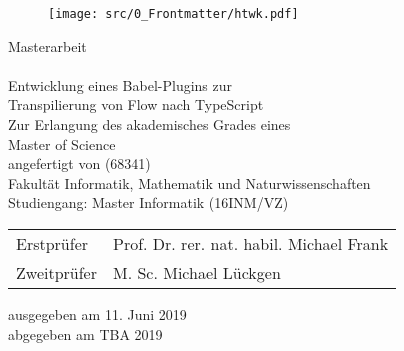 \makeatletter
\begin{titlepage}
  \vspace{1cm}

  \begin{figure}[h!]
    \centering
    \texttt{[image: src/0\_Frontmatter/htwk.pdf]}
  \end{figure}

  \begin{center}
    \vspace{1cm}

    \begin{onehalfspacing}
      {\Large Masterarbeit} \\[8ex]
      {\huge\textbf{\@title}} \\[5ex]
      {\Large\libertineSB Entwicklung eines Babel-Plugins zur\\Transpilierung von Flow nach TypeScript} \\[8ex]
      \large
      Zur Erlangung des akademisches Grades eines \\
      Master of Science \\[5ex]
      \vfill
      {\libertineSB angefertigt von \@author{ }(68341)}\\[5ex]
      \vfill
      Fakultät Informatik, Mathematik und Naturwissenschaften\\
      Studiengang: Master Informatik (16INM/VZ)\\[5ex]
      \vfill
      \begin{tabular}{ll}
        Erstprüfer & Prof. Dr. rer. nat. habil. Michael Frank \\
        Zweitprüfer & M. Sc. Michael Lückgen \\
      \end{tabular}
      \vspace{5ex}
      \vfill
      ausgegeben am 11. Juni 2019 \\
      abgegeben am TBA 2019 %
    \end{onehalfspacing}
  \end{center}
\end{titlepage}
\makeatother
